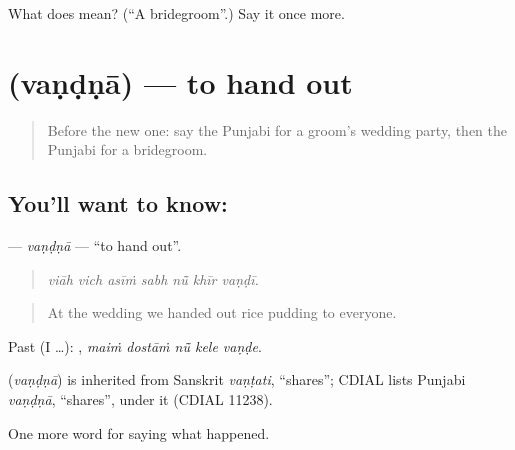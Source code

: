 \begin{tcolorbox}[breakable,colback=teal!4,colframe=teal!35!black,title={Before you move on}]
What does  mean? (\textquotedblleft{}A bridegroom\textquotedblright{}.) Say it once more.
\end{tcolorbox}
\section[\texorpdfstring{\pa{ਵੰਡਣਾ} (vaṇḍṇā)}{ਵੰਡਣਾ (vaṇḍṇā)}]{ (vaṇḍṇā) — to hand out}

\label{lesson:PA-C313-vandna}



\begin{quote}
Before the new one: say the Punjabi for a groom's wedding party, then the Punjabi for a bridegroom.
\end{quote}

\subsection*{You'll want to know: }
\textbf{} — \emph{vaṇḍṇā} — \textquotedblleft{}to hand out\textquotedblright{}.

\begin{quote}
      
\end{quote}

\begin{quote}
\emph{viāh vich asīṁ sabh nū̃ khīr vaṇḍī.}
\end{quote}

\begin{quote}
At the wedding we handed out rice pudding to everyone.
\end{quote}

Past (I …):     , \emph{maiṁ dostāṁ nū̃ kele vaṇḍe}.

\begin{cousinweb}
\textbf{} (\emph{vaṇḍṇā}) is inherited from Sanskrit \emph{vaṇṭati}, \textquotedblleft{}shares\textquotedblright{}; CDIAL lists Punjabi \emph{vaṇḍṇā}, \textquotedblleft{}shares\textquotedblright{}, under it (CDIAL 11238).
\end{cousinweb}

\begin{grammarlens}[title={What you've built}]
One more word for saying what happened.
\end{grammarlens}

